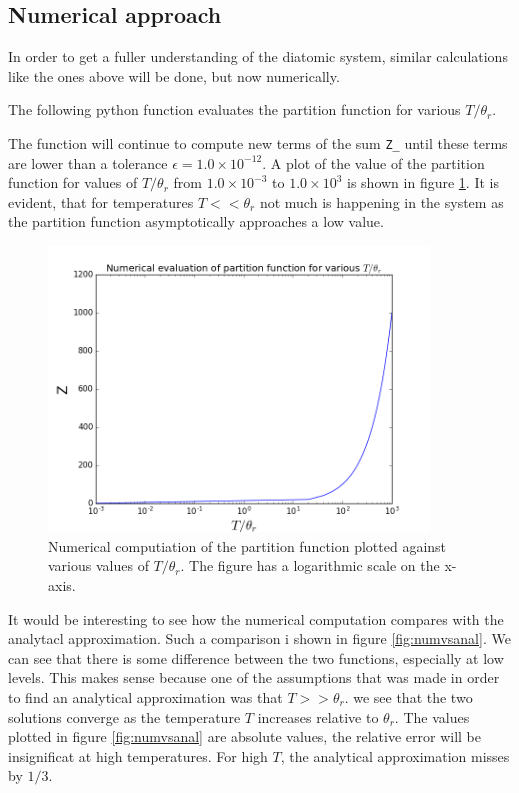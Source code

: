 \documentclass[10pt,a4paper]{amsart}
\begin{document}
\subsection{Numerical approach}
In order to get a fuller understanding of the diatomic system, similar calculations like the ones above will be done, but now numerically.

The following python function evaluates the partition function for various $T/\theta_r$.

The function will continue to compute new terms of the sum \lstinline|Z_| until these terms are lower than a tolerance $\epsilon=1.0\times10^{-12}$. A plot of the value of the partition function for values of $T/\theta_r$ from $1.0\times10^{-3}$ to $1.0\times10^{3}$ is shown in figure \ref{fig:numpartition}. It is evident, that for temperatures $T << \theta_r$ not much is happening in the system as the partition function asymptotically approaches a low value.

\begin{figure}
	\centering
	\includegraphics[width=0.9\textwidth]{figures/numpartition.png}
	\caption{Numerical computiation of the partition function plotted against various values of $T/\theta_r$. The figure has a logarithmic scale on the x-axis.}
	\label{fig:numpartition}
\end{figure}

It would be interesting to see how the numerical computation compares with the analytacl approximation. Such a comparison i shown in figure \ref{fig:numvsanal}. We can see that there is some difference between the two functions, especially at low levels. This makes sense because one of the assumptions that was made in order to find an analytical approximation was that $T >> \theta_r$. we see that the two solutions converge as the temperature $T$ increases relative to $\theta_r$. The values plotted in figure \ref{fig:numvsanal} are absolute values, the relative error will be insignificat at high temperatures. For high $T$, the analytical approximation misses by $1/3$.
\end{document}
